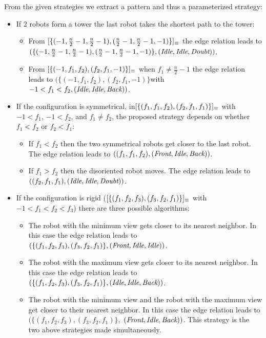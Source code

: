 From the given strategies we extract a pattern and thus a parameterized strategy:  
\begin{itemize}%
	\item If $2$ robots form a tower the last robot takes the shortest path to the tower:  
		\begin{itemize}
		\item From $[\{(-1, \frac{n}{2}-1, \frac{n}{2}-1), (\frac{n}{2}-1, \frac{n}{2}-1, -1)\}]_{\equiv}$ the edge relation leads to 
		$(\{(-1, \frac{n}{2}-1, \frac{n}{2}-1), (\frac{n}{2}-1, \frac{n}{2}-1, -1)\}, (\textit{Idle}, \textit{Idle}, \textit{Doubt}))$.
		\item From $[\{(-1, f_1, f_2), (f_2, f_1, -1)\}]_{\equiv}$ when $f_1 \neq \frac{n}{2}-1$ the edge relation leads to 
		$(\{(-1, f_1, f_2), (f_2, f_1, -1)\}$with $-1< f_1 < f_2, (\textit{Idle}, \textit{Idle}, \textit{Back}))$.
		\end{itemize}
	\item If the configuration is symmetrical, in$[\{(f_1, f_1, f_2), (f_2, f_1, f_1)\}]_{\equiv}$ 
	with $-1 < f_1$, $-1 < f_2$, and $f_1 \neq f_2$, 
	the proposed strategy depends on whether $f_1 < f_2$ or $f_2 < f_1$:  
	\begin{itemize}%
		\item  If $f_1 < f_2$ then the two symmetrical robots get closer to the last robot.  %
		The edge relation leads to $((f_1, f_1, f_2), (\textit{Front}, \textit{Idle}, \textit{Back}))$.
		\item  If $f_1 > f_2$ then the disoriented robot moves. %
		The edge relation leads to $((f_2, f_1, f_1), (\textit{Idle}, \textit{Idle}, \textit{Doubt}))$.
	\end{itemize}
	\item If the configuration is rigid ($[\{(f_1, f_2, f_3), (f_3, f_2, f_1)\}]_{\equiv}$ with $-1< f_1< f_2<f_3$) 
	there are three possible algorithms:  
	\begin{itemize}%
		\item The robot with the minimum view gets closer to its nearest neighbor. %
	In this case the edge relation leads to $(\{(f_1, f_2, f_3), (f_3, f_2, f_1)\}, (\textit{Front}, \textit{Idle}, \textit{Idle}))$.
		\item The robot with the maximum view gets closer to its nearest neighbor. %
	 In this case the edge relation leads to $(\{(f_1, f_2, f_3), (f_3, f_2, f_1)\}, (\textit{Idle}, \textit{Idle}, \textit{Back}))$.
		\item The robot with the minimum view and the robot with the maximum view get
		closer to their nearest neighbor.
	In this case the edge relation leads to $(\{(f_1, f_2, f_3), (f_3, f_2, f_1)\}, $ $(\textit{Front}, \textit{Idle}, \textit{Back}))$.
		This strategy is the two above strategies made simultaneously.%
	\end{itemize}
\end{itemize}

